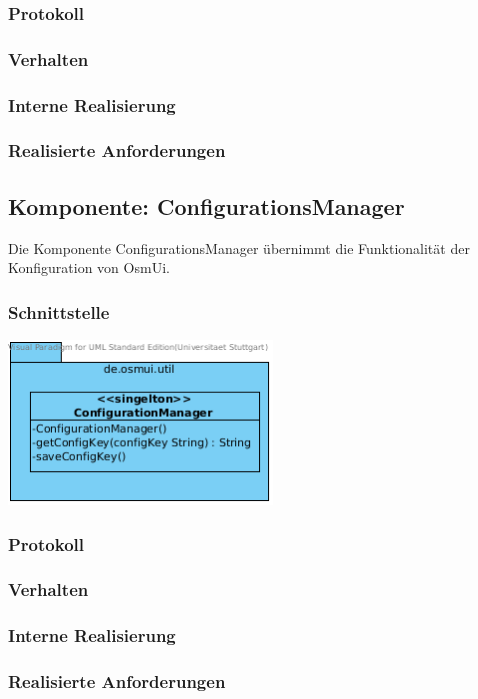 \documentclass[a4paper,12pt]{scrartcl}
\begin{document}
\subsubsection{Protokoll}
\subsubsection{Verhalten}
\subsubsection{Interne Realisierung}
\subsubsection{Realisierte Anforderungen}

\subsection{Komponente: ConfigurationsManager}
Die Komponente ConfigurationsManager übernimmt die Funktionalität der Konfiguration von OsmUi.
\subsubsection{Schnittstelle}
\begin{center}
\includegraphics[width=7cm]{Schnittstelle_ConfigurationManager.png}
\end{center}
\subsubsection{Protokoll}
\subsubsection{Verhalten}
\subsubsection{Interne Realisierung}
\subsubsection{Realisierte Anforderungen}
\end{document}
